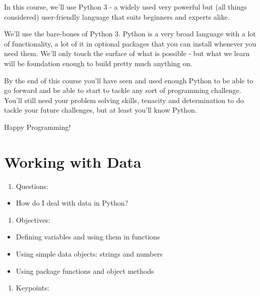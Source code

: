 \documentclass[]{book}
\providecommand{\tightlist}{%
  \setlength{\itemsep}{0pt}\setlength{\parskip}{0pt}}
\theoremstyle{definition}
\theoremstyle{definition}
\theoremstyle{definition}
\theoremstyle{remark}
\begin{document}
In this course, we'll use Python 3 - a widely used very powerful but
(all things considered) user-friendly language that suits beginners and
experts alike.

We'll use the bare-bones of Python 3. Python is a very broad language
with a lot of functionality, a lot of it in optional packages that you
can install whenever you need them. We'll only touch the surface of what
is possible - but what we learn will be foundation enough to build
pretty much anything on.

By the end of this course you'll have seen and used enough Python to be
able to go forward and be able to start to tackle any sort of
programming challenge. You'll still need your problem solving skills,
tenacity and determination to do tackle your future challenges, but at
least you'll know Python.

Happy Programming!

\hypertarget{data}{%
\chapter{Working with Data}\label{data}}

\begin{enumerate}
\def\labelenumi{\arabic{enumi}.}
\tightlist
\item
  Questions:
\end{enumerate}

\begin{itemize}
\tightlist
\item
  How do I deal with data in Python?
\end{itemize}

\begin{enumerate}
\def\labelenumi{\arabic{enumi}.}
\setcounter{enumi}{1}
\tightlist
\item
  Objectives:
\end{enumerate}

\begin{itemize}
\tightlist
\item
  Defining variables and using them in functions
\item
  Using simple data objects: strings and numbers
\item
  Using package functions and object methods
\end{itemize}

\begin{enumerate}
\def\labelenumi{\arabic{enumi}.}
\setcounter{enumi}{2}
\tightlist
\item
  Keypoints:
\end{enumerate}
\end{document}
